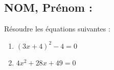 \documentclass[a4paper,11pt,exos]{nsi}
\begin{document}
\subsection*{NOM, Prénom : \dotfill} 


\maketitle




\begin{exercice}
    Résoudre les équations suivantes :
    \begin{multicols}{2}
        \begin{enumerate}
            \item $(3x+4)^2-4=0$
	        \item $4x^2+28x+49=0$
        \end{enumerate}
    \end{multicols}
    
\end{exercice}

\end{document}
